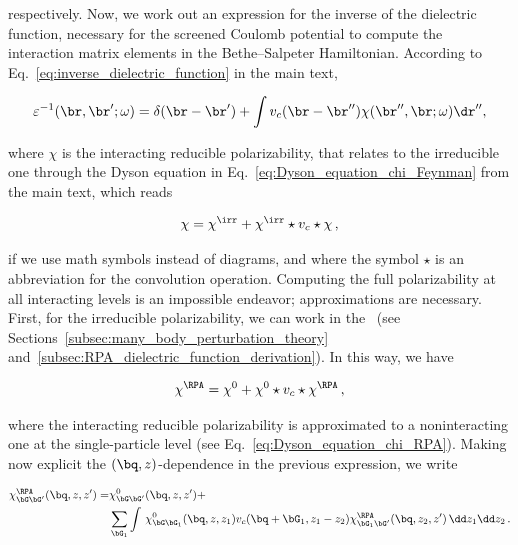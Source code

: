\noindent respectively.
Now, we work out an expression for the inverse of the dielectric function, necessary for the screened Coulomb potential to compute the interaction matrix elements in the Bethe--Salpeter Hamiltonian.
According to Eq.~\eqref{eq:inverse_dielectric_function} in the main text,

\begin{equation}
\varepsilon^{-1} (\br,\br';\omega) = \delta(\br - \br')+\int v_{c}(\br - \br'')\chi(\br'',\br;\omega)\dr'',
\end{equation}

\noindent where $\chi$ is the interacting reducible polarizability, that relates to the irreducible one through the Dyson equation in Eq.~\eqref{eq:Dyson_equation_chi_Feynman} from the main text, which reads

\begin{equation}
\chi = \chi^{\irr}+\chi^{\irr} \star v_{c} \star \chi\,,
\end{equation}

\noindent if we use math symbols instead of diagrams, and where the symbol $\star$ is an abbreviation for the convolution operation.
Computing the full polarizability at all interacting levels is an impossible endeavor; approximations are necessary.
First, for the irreducible polarizability, we can work in the \rpa~(see Sections~\ref{subsec:many_body_perturbation_theory} and~\ref{subsec:RPA_dielectric_function_derivation}).
In this way, we have

\begin{equation}
\chi^{\RPA} = \chi^{0}+\chi^{0} \star v_{c} \star \chi^{\RPA}\,,
\end{equation}

\noindent where the interacting reducible polarizability is approximated to a noninteracting
one at the single-particle level (see Eq.~\eqref{eq:Dyson_equation_chi_RPA}).
Making now explicit the $(\bq,z)$-dependence in the previous expression, we write

\begin{equation}
    \begin{aligned}
        \chi^{\RPA}_{\bG \bG'}(\bq,z,z') = & \chi^{0}_{\bG \bG'}(\bq,z,z') + \\
        &\sum_{\bG_{1}} \int \,\chi^{0}_{\bG \bG_{1}}(\bq,z,z_{1}) v_{c}( \bq +\bG_{1},z_{1}-z_{2}) \chi^{\RPA}_{\bG_{1} \bG'}(\bq,z_{2},z')\,\dd z_{1}\dd z_{2} \,.
    \end{aligned}
    \end{equation}

